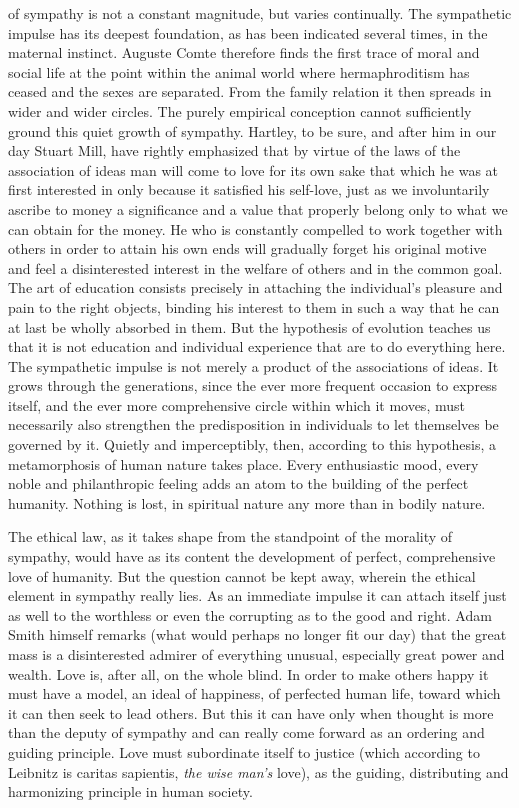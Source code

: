 \documentclass[12pt,a4paper,openany]{book}
\newcommand{\opage}[1]{\marginnote{\footnotesize\textit{[#1]}}}
\begin{document}
of sympathy is not a constant magnitude, but varies continually. The
sympathetic \opage{38}impulse has its deepest foundation, as has been
indicated several times, in the maternal instinct. Auguste Comte therefore
finds the first trace of moral and social life at the point within the animal
world where hermaphroditism has ceased and the sexes are separated. From the
family relation it then spreads in wider and wider circles. The purely
empirical conception cannot sufficiently ground this quiet growth of sympathy.
Hartley, to be sure, and after him in our day Stuart Mill, have rightly
emphasized that by virtue of the laws of the association of ideas man will
come to love for its own sake that which he was at first interested in only
because it satisfied his self-love, just as we involuntarily ascribe to money
a significance and a value that properly belong only to what we can obtain for
the money. He who is constantly compelled to work together with others in
order to attain his own ends will gradually forget his original motive and
feel a disinterested interest in the welfare of others and in the common goal.
The art of education consists precisely in attaching the individual's pleasure
and pain to the right objects, binding his interest to them in such a way that
he can at last be wholly absorbed in them. But the hypothesis of evolution
teaches us that it is not education and individual experience that are to do
everything here. The sympathetic impulse is not merely a product of the
associations of ideas. It grows through the generations, since the ever more
frequent occasion to express itself, and the ever more comprehensive circle
within which it moves, must necessarily also strengthen the predisposition in
individuals to let \opage{39}themselves be governed by it. Quietly and
imperceptibly, then, according to this hypothesis, a metamorphosis of human
nature takes place. Every enthusiastic mood, every noble and philanthropic
feeling adds an atom to the building of the perfect humanity. Nothing is lost,
in spiritual nature any more than in bodily nature.

The ethical law, as it takes shape from the standpoint of the morality of
sympathy, would have as its content the development of perfect, comprehensive
love of humanity. But the question cannot be kept away, wherein the ethical
element in sympathy really lies. As an immediate impulse it can attach itself
just as well to the worthless or even the corrupting as to the good and right.
Adam Smith himself remarks (what would perhaps no longer fit our day) that the
great mass is a disinterested admirer of everything unusual, especially great
power and wealth. Love is, after all, on the whole blind. In order to make
others happy it must have a model, an ideal of happiness, of perfected human
life, toward which it can then seek to lead others. But this it can have only
when thought is more than the deputy of sympathy and can really come forward
as an ordering and guiding principle. Love must subordinate itself to justice
(which according to Leibnitz is caritas sapientis, \emph{the wise man's}
love), as the guiding, distributing and harmonizing principle in human
society.
\end{document}
